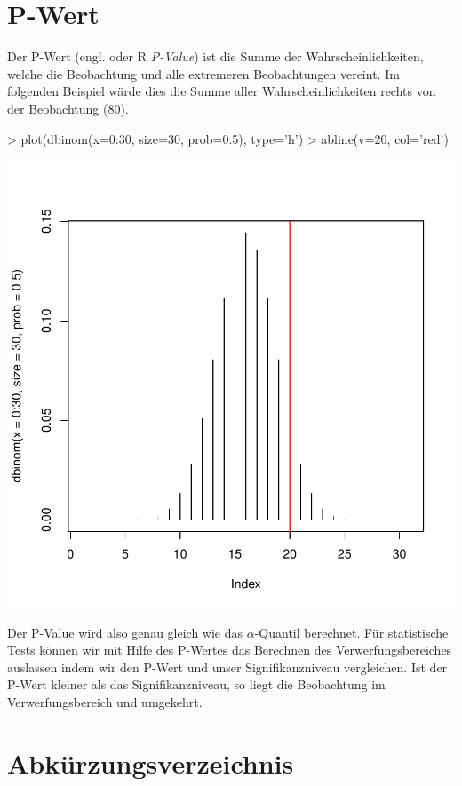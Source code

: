 \section{P-Wert}
Der P-Wert (engl. oder R \emph{P-Value}) ist die Summe der 
Wahrscheinlichkeiten, welche die Beobachtung
und alle extremeren Beobachtungen vereint. Im folgenden Beispiel wärde dies
die Summe aller Wahrscheinlichkeiten rechts von der Beobachtung (80).

\begin{Schunk}
\begin{Sinput}
> plot(dbinom(x=0:30, size=30, prob=0.5), type='h')
> abline(v=20, col='red')
\end{Sinput}
\end{Schunk}
\includegraphics{definitionen-024}

\noindent
Der P-Value wird also genau gleich wie das $\alpha$-Quantil berechnet.
Für statistische Tests können wir mit Hilfe des P-Wertes das Berechnen
des Verwerfungsbereiches auslassen indem wir den P-Wert und unser
Signifikanzniveau vergleichen. Ist der P-Wert kleiner als das 
Signifikanzniveau, so liegt die Beobachtung im Verwerfungsbereich
und umgekehrt.

\section{Abkürzungsverzeichnis}
\begin{acronym}[SQL]
\end{acronym}
